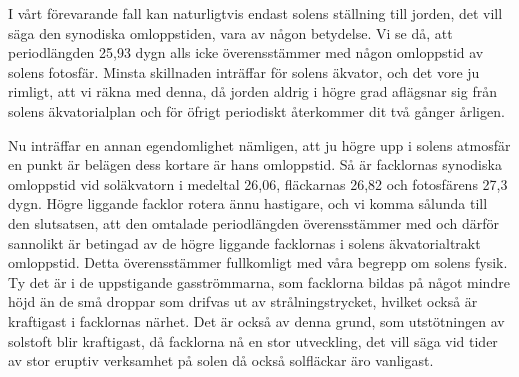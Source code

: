 \documentclass[a4paper, 12pt, oneside, swedish]{article}
\begin{document}
I vårt förevarande fall kan naturligtvis endast solens ställning till jorden, det vill säga den synodiska omloppstiden, vara av någon betydelse. Vi se då, att periodlängden 25,93 dygn alls icke överensstämmer med någon omloppstid av solens fotosfär. Minsta skillnaden inträffar för solens äkvator, och det vore ju rimligt, att vi räkna med denna, då jorden aldrig i högre grad aflägsnar sig från solens äkvatorialplan och för öfrigt periodiskt återkommer dit två gånger årligen.

Nu inträffar en annan egendomlighet nämligen, att ju högre upp i solens atmosfär en punkt är belägen dess kortare är hans omloppstid. Så är facklornas synodiska omloppstid vid soläkvatorn i medeltal 26,06, fläckarnas 26,82 och fotosfärens 27,3 dygn. Högre liggande facklor rotera ännu hastigare, och vi komma sålunda till den slutsatsen, att den omtalade periodlängden överensstämmer med och därför sannolikt är betingad av de högre liggande facklornas i solens äkvatorialtrakt omloppstid. Detta överensstämmer fullkomligt med våra begrepp om solens fysik. Ty det är i de uppstigande gasströmmarna, som facklorna bildas på något mindre höjd än de små droppar som drifvas ut av strålningstrycket, hvilket också är kraftigast i facklornas närhet. Det är också av denna grund, som utstötningen av solstoft blir kraftigast, då facklorna nå en stor utveckling, det vill säga vid tider av stor eruptiv verksamhet på solen då också solfläckar äro vanligast.
\end{document}
